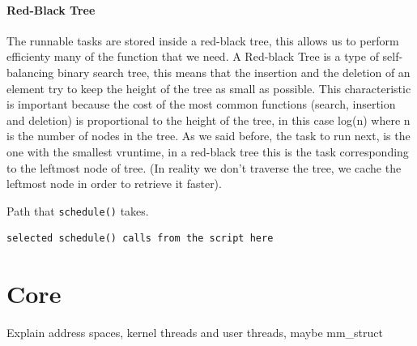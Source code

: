 \documentclass[10pt]{book}
\begin{document}
\paragraph{Red-Black Tree}
The runnable tasks are stored inside a red-black tree, this allows us to perform efficienty many of the function that we need.
A Red-black Tree is a type of self-balancing binary search tree, this means that the insertion and the deletion of an element try to keep the height of the tree as small as possible. This characteristic is important because the cost of the most common functions (search, insertion and deletion) is proportional to the height of the tree, in this case log(n) where n is the number of nodes in the tree.
As we said before, the task to run next, is the one with the smallest vruntime, in a red-black tree this is the task corresponding to the leftmost node of tree. (In reality we don't traverse the tree, we cache the leftmost node in order to retrieve it faster).

Path that \verb|schedule()| takes.

\begin{Verbatim}
selected schedule() calls from the script here
\end{Verbatim}

\section{Core} 
\label{sec:core}
Explain address spaces, kernel threads and user threads, maybe mm\_struct
\end{document}
